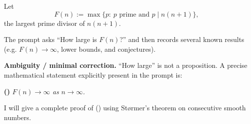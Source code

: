 Let
\[
F(n) := \max\{p:\ p\text{ prime and }p\mid n(n+1)\},
\]
the largest prime divisor of $n(n+1)$.

The prompt asks ``How large is $F(n)$?'' and then records several known results (e.g. $F(n)\to\infty$, lower bounds, and conjectures).

\textbf{Ambiguity / minimal correction.} ``How large'' is not a proposition.
A precise mathematical statement explicitly present in the prompt is:

\medskip
\noindent\textbf{(\*)} \emph{$F(n)\to\infty$ as $n\to\infty$.}

I will give a complete proof of (\*) using St\o rmer's theorem on consecutive smooth numbers.
